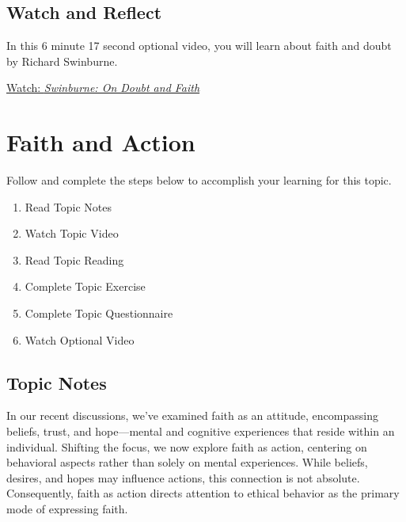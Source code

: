 \documentclass[
]{book}
\providecommand{\tightlist}{%
  \setlength{\itemsep}{0pt}\setlength{\parskip}{0pt}}
\begin{document}
\hypertarget{watch-and-reflect-9}{%
\subsection*{Watch and Reflect}\label{watch-and-reflect-9}}

\begin{reflect}
In this 6 minute 17 second optional video, you will learn about faith and doubt by Richard Swinburne.

\href{https://www.youtube.com/watch?v=exsmSlxnbHQ}{Watch: \emph{Swinburne: On Doubt and Faith}}
\end{reflect}

\hypertarget{faith-and-action}{%
\section{Faith and Action}\label{faith-and-action}}

Follow and complete the steps below to accomplish your learning for this topic.

\begin{enumerate}
\def\labelenumi{\arabic{enumi}.}
\tightlist
\item
  Read Topic Notes
\item
  Watch Topic Video
\item
  Read Topic Reading
\item
  Complete Topic Exercise
\item
  Complete Topic Questionnaire
\item
  Watch Optional Video
\end{enumerate}

\hypertarget{topic-notes-6}{%
\subsection*{Topic Notes}\label{topic-notes-6}}

In our recent discussions, we've examined faith as an attitude, encompassing beliefs, trust, and hope---mental and cognitive experiences that reside within an individual. Shifting the focus, we now explore faith as action, centering on behavioral aspects rather than solely on mental experiences. While beliefs, desires, and hopes may influence actions, this connection is not absolute. Consequently, faith as action directs attention to ethical behavior as the primary mode of expressing faith.
\end{document}

